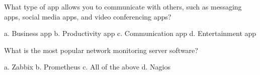 \documentclass{exam}
\begin{document}
\begin{questions}
\question What type of app allows you to communicate with others, such as messaging apps, social media apps, and video conferencing apps?
\begin{checkboxes}
\choice a. Business app
\choice b. Productivity app
\CorrectChoice c. Communication app
\choice d. Entertainment app
\end{checkboxes}

\question What is the most popular network monitoring server software?
\begin{checkboxes}
\choice a. Zabbix
\choice b. Prometheus
\CorrectChoice c. All of the above
\choice d. Nagios
\end{checkboxes}

\end{questions}
\end{document}
